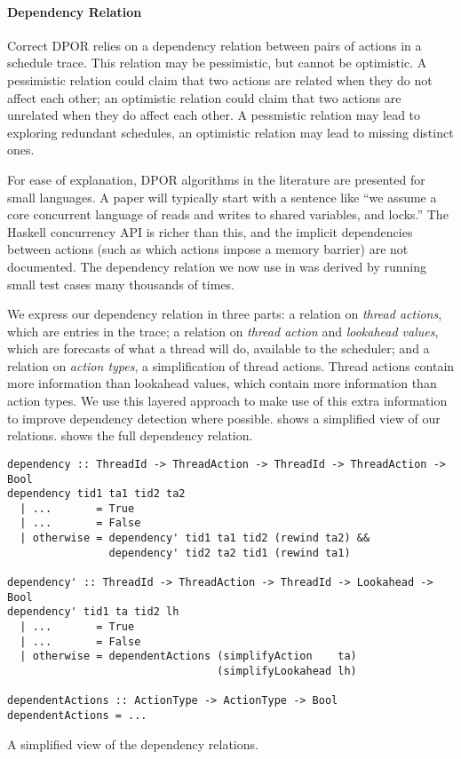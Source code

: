 \paragraph{Dependency Relation}
Correct DPOR relies on a dependency relation between pairs of actions
in a schedule trace.  This relation may be pessimistic, but cannot be
optimistic.  A pessimistic relation could claim that two actions are
related when they do not affect each other; an optimistic relation
could claim that two actions are unrelated when they do affect each
other.  A pessmistic relation may lead to exploring redundant
schedules, an optimistic relation may lead to missing distinct ones.

For ease of explanation, DPOR algorithms in the literature are
presented for small languages.  A paper will typically start with a
sentence like ``we assume a core concurrent language of reads and
writes to shared variables, and locks.''  The Haskell concurrency API
is richer than this, and the implicit dependencies between actions
(such as which actions impose a memory barrier) are not documented.
The dependency relation we now use in \dejafu{} was derived by running
small test cases many thousands of times.

We express our dependency relation in three parts: a relation on
\emph{thread actions}, which are entries in the trace; a relation on
\emph{thread action} and \emph{lookahead values}, which are forecasts
of what a thread will do, available to the scheduler; and a relation
on \emph{action types}, a simplification of thread actions.  Thread
actions contain more information than lookahead values, which contain
more information than action types.  We use this layered approach to
make use of this extra information to improve dependency detection
where possible.   shows a simplified view of our
relations.   shows the full dependency relation.

\begin{listing}
  \begin{verbatim}
dependency :: ThreadId -> ThreadAction -> ThreadId -> ThreadAction -> Bool
dependency tid1 ta1 tid2 ta2
  | ...       = True
  | ...       = False
  | otherwise = dependency' tid1 ta1 tid2 (rewind ta2) &&
                dependency' tid2 ta2 tid1 (rewind ta1)

dependency' :: ThreadId -> ThreadAction -> ThreadId -> Lookahead -> Bool
dependency' tid1 ta tid2 lh
  | ...       = True
  | ...       = False
  | otherwise = dependentActions (simplifyAction    ta)
                                 (simplifyLookahead lh)

dependentActions :: ActionType -> ActionType -> Bool
dependentActions = ...
  \end{verbatim}
  \caption{A simplified view of the \dejafu{} dependency relations.}\label{lst:deprel-simp}
\end{listing}

